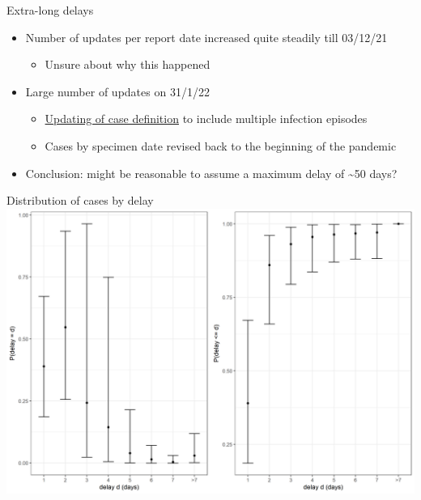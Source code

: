\documentclass[
  ignorenonframetext,
]{beamer}
\providecommand{\tightlist}{%
  \setlength{\itemsep}{0pt}\setlength{\parskip}{0pt}}\usepackage{longtable,booktabs,array}
\begin{document}
\begin{frame}{Extra-long delays}
\protect\hypertarget{extra-long-delays-1}{}
\begin{itemize}
\tightlist
\item
  Number of updates per report date increased quite steadily till
  03/12/21

  \begin{itemize}
  \tightlist
  \item
    Unsure about why this happened
  \end{itemize}
\item
  Large number of updates on 31/1/22

  \begin{itemize}
  \tightlist
  \item
    \href{https://coronavirus.data.gov.uk/details/whats-new/record/beb802ac-1ed2-47ac-b314-69a5c3f712b5}{Updating
    of case definition} to include multiple infection episodes
  \item
    Cases by specimen date revised back to the beginning of the pandemic
  \end{itemize}
\item
  Conclusion: might be reasonable to assume a maximum delay of
  \textasciitilde50 days?
\end{itemize}
\end{frame}

\begin{frame}{Distribution of cases by delay}
\protect\hypertarget{distribution-of-cases-by-delay}{}
\includegraphics{progress_presentation_files/figure-beamer/unnamed-chunk-3-1.png}
\end{frame}
\end{document}
